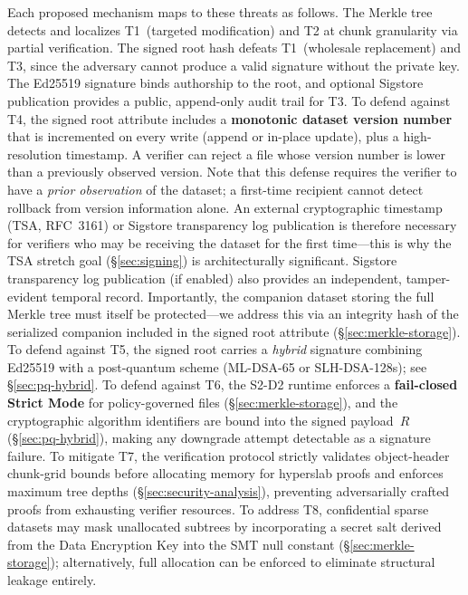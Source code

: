 \documentclass[11pt]{article}
\begin{document}
\noindent Each proposed mechanism maps to these threats as follows. The Merkle
tree detects and localizes T1~(targeted modification) and T2 at chunk
granularity via partial verification. The signed root hash defeats T1~(wholesale
replacement) and T3, since the adversary cannot produce a valid signature
without the private key. The Ed25519 signature binds authorship to the root,
and optional Sigstore publication provides a public, append-only audit trail
for T3. To defend against T4, the signed root attribute includes a
\textbf{monotonic dataset version number} that is incremented on every write
(append or in-place update), plus a high-resolution timestamp. A verifier can
reject a file whose version number is lower than a previously observed version.
Note that this defense requires the verifier to have a \emph{prior observation}
of the dataset; a first-time recipient cannot detect rollback from version
information alone. An external cryptographic timestamp (TSA, RFC~3161) or
Sigstore transparency log publication is therefore necessary for verifiers
who may be receiving the dataset for the first time---this is why the
TSA stretch goal (\S\ref{sec:signing}) is architecturally significant.
Sigstore transparency log publication (if enabled) also provides an independent,
tamper-evident temporal record. Importantly, the companion dataset storing the
full Merkle tree must itself be protected---we address this via an integrity
hash of the serialized companion included in the signed root attribute
(\S\ref{sec:merkle-storage}). To defend against T5, the signed root carries a
\emph{hybrid} signature combining Ed25519 with a post-quantum scheme
(ML-DSA-65 or SLH-DSA-128s); see \S\ref{sec:pq-hybrid}.
To defend against T6, the S2-D2 runtime enforces a \textbf{fail-closed Strict
Mode} for policy-governed files (\S\ref{sec:merkle-storage}), and the
cryptographic algorithm identifiers are bound into the signed payload~$R$
(\S\ref{sec:pq-hybrid}), making any downgrade attempt detectable as a
signature failure. To mitigate T7, the verification protocol strictly validates
object-header chunk-grid bounds before allocating memory for hyperslab proofs
and enforces maximum tree depths (\S\ref{sec:security-analysis}), preventing
adversarially crafted proofs from exhausting verifier resources. To address T8,
confidential sparse datasets may mask unallocated subtrees by incorporating a
secret salt derived from the Data Encryption Key into the SMT null constant
(\S\ref{sec:merkle-storage}); alternatively, full allocation can be enforced
to eliminate structural leakage entirely.
\end{document}
